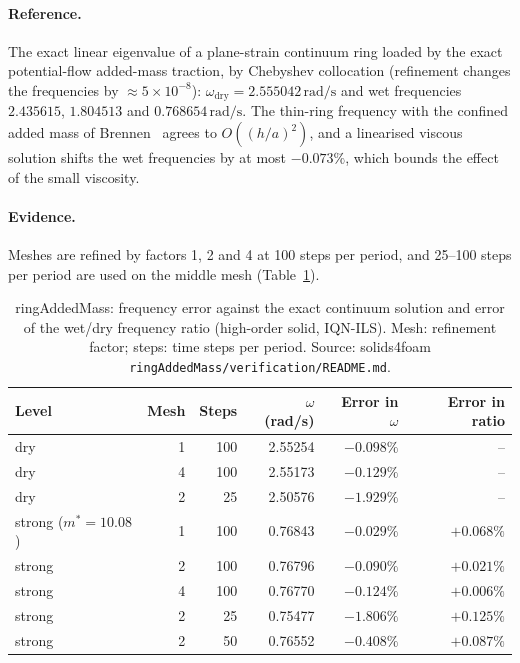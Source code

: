 \paragraph{Reference.}
The exact linear eigenvalue of a plane-strain continuum ring loaded by the exact potential-flow added-mass traction, by Chebyshev collocation (refinement changes the frequencies by $\approx5\times10^{-8}$): $\omega_\mathrm{dry} = 2.555042\,\mathrm{rad/s}$ and wet frequencies $2.435615$, $1.804513$ and $0.768654\,\mathrm{rad/s}$.
The thin-ring frequency with the confined added mass of Brennen~\citep{Brennen1982} agrees to $O((h/a)^2)$, and a linearised viscous solution shifts the wet frequencies by at most $-0.073\%$, which bounds the effect of the small viscosity.

\paragraph{Evidence.}
Meshes are refined by factors 1, 2 and 4 at 100 steps per period, and 25--100 steps per period are used on the middle mesh (Table~\ref{tab:ring}).

\begin{table}[htbp]
	\centering
	\small
	\setlength{\tabcolsep}{5pt}
	\caption{ringAddedMass: frequency error against the exact continuum solution and error of the wet/dry frequency ratio (high-order solid, IQN-ILS). Mesh: refinement factor; steps: time steps per period. Source: solids4foam \texttt{ringAddedMass/verification/README.md}.}
	\label{tab:ring}
	\begin{tabular}{lrrrrr}
		\toprule
		Level & Mesh & Steps & $\omega$ (rad/s) & Error in $\omega$ & Error in ratio \\
		\midrule
		dry & 1 & 100 & 2.55254 & $-0.098\%$ & -- \\
		dry & 4 & 100 & 2.55173 & $-0.129\%$ & -- \\
		dry & 2 & 25 & 2.50576 & $-1.929\%$ & -- \\
		strong ($m^*=10.08$) & 1 & 100 & 0.76843 & $-0.029\%$ & $+0.068\%$ \\
		strong & 2 & 100 & 0.76796 & $-0.090\%$ & $+0.021\%$ \\
		strong & 4 & 100 & 0.76770 & $-0.124\%$ & $+0.006\%$ \\
		strong & 2 & 25 & 0.75477 & $-1.806\%$ & $+0.125\%$ \\
		strong & 2 & 50 & 0.76552 & $-0.408\%$ & $+0.087\%$ \\
		\bottomrule
	\end{tabular}
\end{table}

